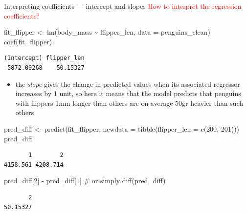 \documentclass[
  10pt,
  ignorenonframetext,
  aspectratio=169,
  t]{beamer}
\newenvironment{Shaded}{\begin{snugshade}}{\end{snugshade}}
\newcommand{\AttributeTok}[1]{\textcolor[rgb]{0.40,0.45,0.13}{#1}}
\newcommand{\CommentTok}[1]{\textcolor[rgb]{0.37,0.37,0.37}{#1}}
\newcommand{\DecValTok}[1]{\textcolor[rgb]{0.68,0.00,0.00}{#1}}
\newcommand{\FunctionTok}[1]{\textcolor[rgb]{0.28,0.35,0.67}{#1}}
\newcommand{\NormalTok}[1]{\textcolor[rgb]{0.00,0.23,0.31}{#1}}
\newcommand{\OtherTok}[1]{\textcolor[rgb]{0.00,0.23,0.31}{#1}}
\newcommand{\SpecialCharTok}[1]{\textcolor[rgb]{0.37,0.37,0.37}{#1}}
\providecommand{\tightlist}{%
  \setlength{\itemsep}{0pt}\setlength{\parskip}{0pt}}
\newcommand{\blueit}[1]{\textcolor{bluebeamer}{\emph{#1}}}
\begin{document}
\begin{frame}[fragile]{Interpreting coefficients --- intercept and
slopes}
\protect{}\label{interpreting-coefficients-intercept-and-slopes-1}
\textcolor{red}{How to interpret the regression coefficients?}

\footnotesize

\begin{Shaded}
\begin{Highlighting}[]
\NormalTok{fit\_flipper }\OtherTok{\textless{}{-}} \FunctionTok{lm}\NormalTok{(body\_mass }\SpecialCharTok{\textasciitilde{}}\NormalTok{ flipper\_len, }\AttributeTok{data =}\NormalTok{ penguins\_clean)}
\FunctionTok{coef}\NormalTok{(fit\_flipper)}
\end{Highlighting}
\end{Shaded}

\begin{verbatim}
(Intercept) flipper_len 
-5872.09268    50.15327 
\end{verbatim}

\normalsize

\begin{itemize}
\tightlist
\item
  the \blueit{slope} gives the change in predicted values when its
  associated regressor increases by 1 unit, so here it means that the
  model predicts that penguins with flippers 1mm longer than others are
  on average 50gr heavier than such others
\end{itemize}

\footnotesize

\begin{Shaded}
\begin{Highlighting}[]
\NormalTok{pred\_diff }\OtherTok{\textless{}{-}} \FunctionTok{predict}\NormalTok{(fit\_flipper, }\AttributeTok{newdata =} \FunctionTok{tibble}\NormalTok{(}\AttributeTok{flipper\_len =} \FunctionTok{c}\NormalTok{(}\DecValTok{200}\NormalTok{, }\DecValTok{201}\NormalTok{)))}
\NormalTok{pred\_diff}
\end{Highlighting}
\end{Shaded}

\begin{verbatim}
       1        2 
4158.561 4208.714 
\end{verbatim}

\begin{Shaded}
\begin{Highlighting}[]
\NormalTok{pred\_diff[}\DecValTok{2}\NormalTok{] }\SpecialCharTok{{-}}\NormalTok{ pred\_diff[}\DecValTok{1}\NormalTok{] }\CommentTok{\# or simply diff(pred\_diff)}
\end{Highlighting}
\end{Shaded}

\begin{verbatim}
       2 
50.15327 
\end{verbatim}

\normalsize
\end{frame}
\end{document}
